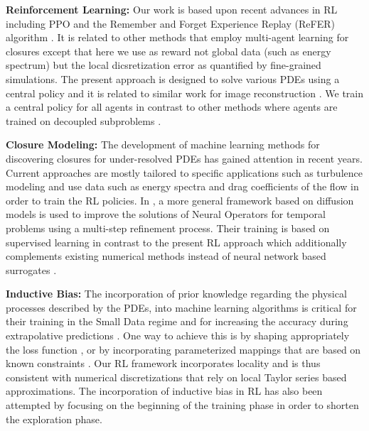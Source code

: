 \documentclass{article}
\theoremstyle{plain}
\theoremstyle{definition}
\theoremstyle{remark}
\begin{document}
\textbf{Reinforcement Learning:}
Our work is based upon recent advances in RL \cite{sutton2018reinforcement} including  PPO \cite{ppo} and the Remember and Forget Experience Replay (ReFER) algorithm \cite{novati2019}. It is  related to other methods that employ multi-agent learning \cite{novati2021automating,albrecht2023multi, wen2022multi,bae2022scientific,yang2020overview} for closures except that here we use as reward not global data (such as energy spectrum) but the local dicsretization error as quantified by fine-grained simulations. The present approach is designed to solve various PDEs using a central policy and it is related to similar work for  image reconstruction \cite{cv_pixel_rl}. We train a central policy for all agents in contrast to other methods where agents are trained on  decoupled subproblems \cite{freed2021learning, albrecht2023multi, sutton2023reward}. 

\textbf{Closure Modeling:}
The development of machine learning methods for discovering closures for under-resolved  PDEs has gained attention in recent years. Current approaches are mostly tailored to specific applications such as turbulence modeling \cite{ling2016reynolds, durbin2018some,novati2021automating,bae2022scientific} and use data such as energy spectra and drag coefficients of the flow in order to train the RL policies. In \cite{lippe2023pde}, a more general framework based on diffusion models is used to improve the solutions of Neural Operators for temporal problems using a multi-step refinement process. Their training is based on supervised learning in contrast to the present RL approach which additionally complements existing numerical methods instead of neural network based surrogates \cite{li2020fourier,gupta2022towards}.

\textbf{Inductive Bias:}  
The incorporation of  prior knowledge regarding the physical processes described by the PDEs, into machine learning algorithms is critical for their training in the Small Data regime and for increasing the accuracy during extrapolative predictions \cite{goyal2022inductive}. One way to achieve this is by shaping appropriately the loss function \cite{karniadakis2021physics, kaltenbach2020incorporating,yin2021augmenting, wang2021learning, wang2022respecting}, or by incorporating parameterized mappings that are based on known constraints \cite{greydanus2019hamiltonian,kaltenbach2021physics, cranmer2020lagrangian}. Our RL framework incorporates locality and is thus consistent with numerical discretizations that rely on local Taylor series based approximations. The incorporation of  inductive bias in RL has also been attempted by focusing on the beginning of the training phase \cite{uchendu2023jump,walke2023don} in order to shorten the exploration phase.
\end{document}

